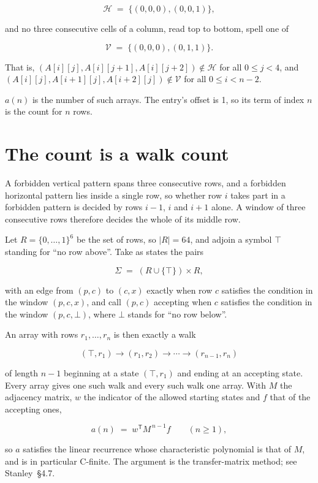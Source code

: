 \documentclass[11pt]{article}
\theoremstyle{definition}
\begin{document}
\[\mathcal{H} \;=\; \{(0,0,0), (0,0,1)\},\]

and no three consecutive cells of a column, read top to bottom, spell one of

\[\mathcal{V} \;=\; \{(0,0,0), (0,1,1)\}.\]

That is, $(A[i][j],A[i][j{+}1],A[i][j{+}2]) \notin \mathcal{H}$ for all $0 \le j < 4$, and $(A[i][j],A[i{+}1][j],A[i{+}2][j]) \notin \mathcal{V}$ for all $0 \le i < n-2$.

$a(n)$ is the number of such arrays. The entry's offset is 1, so its term of index $n$ is the count for $n$ rows.

\section{The count is a walk count}

A forbidden vertical pattern spans three consecutive rows, and a forbidden horizontal pattern lies inside a single row, so whether row $i$ takes part in a forbidden pattern is decided by rows $i-1$, $i$ and $i+1$ alone. A window of three consecutive rows therefore decides the whole of its middle row.

Let $R = \{0,\dots,1\}^{6}$ be the set of rows, so $|R| = 64$, and adjoin a symbol $\top$ standing for ``no row above''. Take as states the pairs

\[\Sigma \;=\; (R \cup \{\top\}) \times R,\]

with an edge from $(p,c)$ to $(c,x)$ exactly when row $c$ satisfies the condition in the window $(p,c,x)$, and call $(p,c)$ accepting when $c$ satisfies the condition in the window $(p,c,\bot)$, where $\bot$ stands for ``no row below''.

An array with rows $r_1,\dots,r_n$ is then exactly a walk

\[(\top,r_1) \to (r_1,r_2) \to \cdots \to (r_{n-1},r_n)\]

of length $n-1$ beginning at a state $(\top,r_1)$ and ending at an accepting state. Every array gives one such walk and every such walk one array. With $M$ the adjacency matrix, $w$ the indicator of the allowed starting states and $f$ that of the accepting ones,

\[a(n) \;=\; w^{\mathsf T} M^{\,n-1} f \qquad (n \ge 1),\]

so $a$ satisfies the linear recurrence whose characteristic polynomial is that of $M$, and is in particular C-finite. The argument is the transfer-matrix method; see Stanley~\S4.7.
\end{document}
